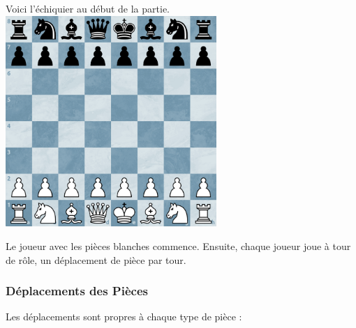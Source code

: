 \documentclass{article}
\begin{document}
\begin{minipage}{\textwidth}
    \centering
    Voici l'échiquier au début de la partie. \\
    \includegraphics[width=0.6\textwidth]{jeuDepart.png}
    \vspace{0.5cm}
\end{minipage}

Le joueur avec les pièces blanches commence. Ensuite, chaque joueur joue à tour de rôle, un déplacement de pièce par tour.

\subsubsection{Déplacements des Pièces}
Les déplacements sont propres à chaque type de pièce :
\vspace{0.5cm}
\end{document}
